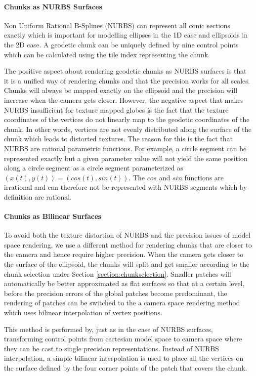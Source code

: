 \paragraph{Chunks as NURBS Surfaces}
Non Uniform Rational B-Splines (NURBS) can represent all conic sections exactly which is important for modelling ellipses in the 1D case and ellipsoids in the 2D case. A geodetic chunk can be uniquely defined by nine control points which can be calculated using the tile index representing the chunk.

The positive aspect about rendering geodetic chunks as NURBS surfaces is that it is a unified way of rendering chunks and that the precision works for all scales. Chunks will always be mapped exactly on the ellipsoid and the precision will increase when the camera gets closer. However, the negative aspect that makes NURBS insufficient for texture mapped globes is the fact that the texture coordinates of the vertices do not linearly map to the geodetic coordinates of the chunk. In other words, vertices are not evenly distributed along the surface of the chunk which leads to distorted textures. The reason for this is the fact that NURBS are rational parametric functions. For example, a circle segment can be represented exactly but a given parameter value will not yield the same position along a circle segment as a circle segment parameterized as $(x(t),y(t)) = (cos(t), sin(t))$. The $cos$ and $sin$ functions are irrational and can therefore not be represented with NURBS segments which by definition are rational.

\paragraph{Chunks as Bilinear Surfaces}
To avoid both the texture distortion of NURBS and the precision issues of model space rendering, we use a different method for rendering chunks that are closer to the camera and hence require higher precision. When the camera gets closer to the surface of the ellipsoid, the chunks will split and get smaller according to the chunk selection under Section \ref{section:chunkselection}. Smaller patches will automatically be better approximated as flat surfaces so that at a certain level, before the precision errors of the global patches become predominant, the rendering of patches can be switched to the a camera space rendering method which uses bilinear interpolation of vertex positions.

This method is performed by, just as in the case of NURBS surfaces, transforming control points from cartesian model space to camera space where they can be cast to single precision representations. Instead of NURBS interpolation, a simple bilinear interpolation is used to place all the vertices on the surface defined by the four corner points of the patch that covers the chunk.

